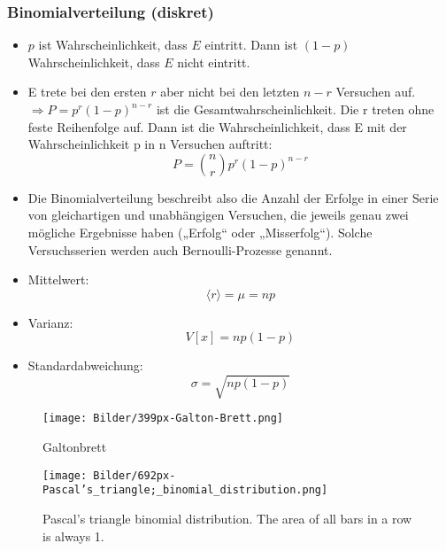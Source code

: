\documentclass[10pt,a4paper]{article}
\begin{document}
\newpage
\subsubsection{Binomialverteilung (diskret)	}
\begin{itemize}
\item $p$ ist Wahrscheinlichkeit, dass $E$ eintritt. Dann ist $(1-p)$ Wahrscheinlichkeit, dass $E$ nicht eintritt.
\item E trete bei den ersten $r$ aber nicht bei den letzten $n-r$ Versuchen auf. $\Rightarrow P=p^r(1-p)^{n-r}$ ist die Gesamtwahrscheinlichkeit.
Die r treten ohne feste Reihenfolge auf. Dann ist die Wahrscheinlichkeit, dass E mit der Wahrscheinlichkeit p in n Versuchen auftritt:
\begin{equation}	
	P=\binom{n}{r} p^r (1-p)^{n-r}
\end{equation}		 
\item Die Binomialverteilung beschreibt also die Anzahl der Erfolge in einer Serie von gleichartigen und unabhängigen Versuchen, die jeweils genau zwei mögliche Ergebnisse haben („Erfolg“ oder „Misserfolg“). Solche Versuchsserien werden auch Bernoulli-Prozesse genannt.
\item Mittelwert:
	\begin{equation}
		\langle r \rangle = \mu = np
	\end{equation} 
\item Varianz:
	\begin{equation}
		V[x]=np(1-p)
	\end{equation}
\item Standardabweichung:
	\begin{equation}
		\sigma = \sqrt{np(1-p)}
	\end{equation}
\end{itemize}

\begin{figure}[h]
\begin{minipage}[hbt]{5cm}
	\centering
	\texttt{[image: Bilder/399px-Galton-Brett.png]}
	\caption{Galtonbrett}
	\label{Bild1}
\end{minipage}
\hfill
\begin{minipage}[hbt]{5cm}
	\centering
	\texttt{[image: Bilder/692px-Pascal's\_triangle;\_binomial\_distribution.png]}
	\caption{Pascal's triangle binomial distribution. The area of all bars in a row is always 1.}
	\label{Bild2}
\end{minipage}
\end{figure}
\end{document}
